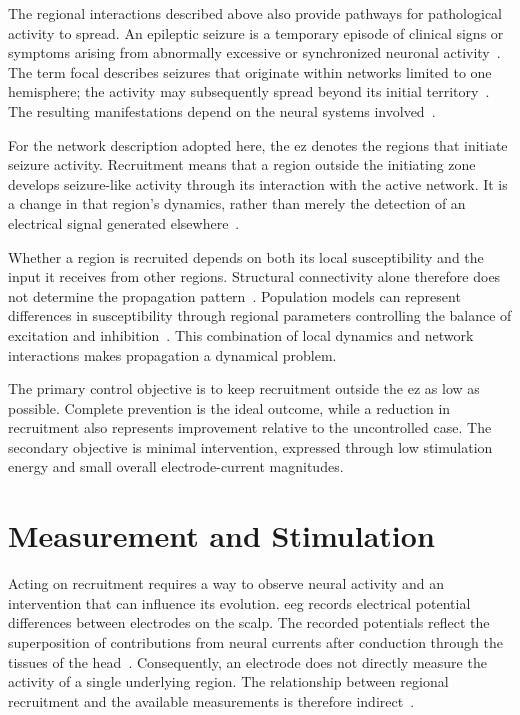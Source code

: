 The regional interactions described above also provide pathways for pathological activity to spread.
An epileptic seizure is a temporary episode of clinical signs or symptoms arising from abnormally excessive or synchronized neuronal activity~\cite{Fisher2005}.
The term focal describes seizures that originate within networks limited to one hemisphere; the activity may subsequently spread beyond its initial territory~\cite{Fisher2017}.
The resulting manifestations depend on the neural systems involved~\cite{Fisher2017}.

For the network description adopted here, the \ac{ez} denotes the regions that initiate seizure activity.
Recruitment means that a region outside the initiating zone develops seizure-like activity through its interaction with the active network.
It is a change in that region's dynamics, rather than merely the detection of an electrical signal generated elsewhere~\cite{Olmi2019}. %

Whether a region is recruited depends on both its local susceptibility and the input it receives from other regions.
Structural connectivity alone therefore does not determine the propagation pattern~\cite{Olmi2019}.
Population models can represent differences in susceptibility through regional parameters controlling the balance of excitation and inhibition~\cite{Wendling2002,Yu2024}.
This combination of local dynamics and network interactions makes propagation a dynamical problem.

The primary control objective is to keep recruitment outside the \ac{ez} as low as possible.
Complete prevention is the ideal outcome, while a reduction in recruitment also represents improvement relative to the uncontrolled case.
The secondary objective is minimal intervention, expressed through low stimulation energy and small overall electrode-current magnitudes.

\section{Measurement and Stimulation}
\label{sec:measurement_intervention_background}

Acting on recruitment requires a way to observe neural activity and an intervention that can influence its evolution.
\Ac{eeg} records electrical potential differences between electrodes on the scalp.
The recorded potentials reflect the superposition of contributions from neural currents after conduction through the tissues of the head~\cite{Buzsaki2012}.
Consequently, an electrode does not directly measure the activity of a single underlying region.
The relationship between regional recruitment and the available measurements is therefore indirect~\cite{Buzsaki2012}.

